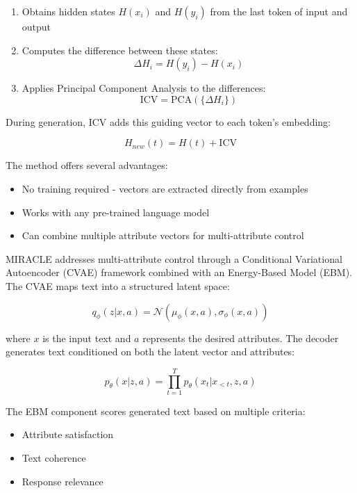 \begin{enumerate}
    \item Obtains hidden states $H(x_i)$ and $H(y_i)$ from the last token of input and output
    \item Computes the difference between these states:
    \begin{equation}
        \Delta H_i = H(y_i) - H(x_i)
    \end{equation}
    \item Applies Principal Component Analysis to the differences:
    \begin{equation}
        \text{ICV} = \text{PCA}(\{\Delta H_i\})
    \end{equation}
\end{enumerate}

During generation, ICV adds this guiding vector to each token's embedding:

\begin{equation}
    H_{new}(t) = H(t) + \text{ICV}
\end{equation}

The method offers several advantages:
\begin{itemize}
    \item No training required - vectors are extracted directly from examples
    \item Works with any pre-trained language model
    \item Can combine multiple attribute vectors for multi-attribute control
\end{itemize}

MIRACLE addresses multi-attribute control through a Conditional Variational Autoencoder (CVAE) framework combined with an Energy-Based Model (EBM). The CVAE maps text into a structured latent space:

\begin{equation}
    q_\phi(z|x, a) = \mathcal{N}(\mu_\phi(x, a), \sigma_\phi(x, a))
\end{equation}

where $x$ is the input text and $a$ represents the desired attributes. The decoder generates text conditioned on both the latent vector and attributes:

\begin{equation}
    p_\theta(x|z, a) = \prod_{t=1}^T p_\theta(x_t|x_{<t}, z, a)
\end{equation}

The EBM component scores generated text based on multiple criteria:
\begin{itemize}
    \item Attribute satisfaction
    \item Text coherence
    \item Response relevance
\end{itemize}

